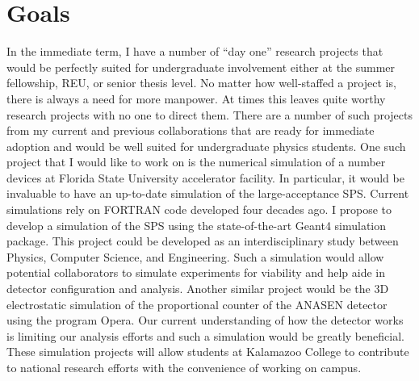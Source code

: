 {%
\section*{Goals}
In the immediate term, I have a number of ``day one'' research projects that would be perfectly suited for undergraduate involvement either at the summer fellowship, REU, or senior thesis level.
No matter how well-staffed a project is, there is always a need for more manpower.
At times %
this leaves quite worthy research projects with no one to direct them. There are a number of such projects from my current and previous collaborations that are ready for immediate adoption and would be well suited for undergraduate physics students.
One such project that I would like to work on %
is the numerical simulation of a number devices at Florida State University accelerator facility. In particular, it would be invaluable to have an up-to-date simulation of the large-acceptance SPS. Current simulations rely on FORTRAN code developed four decades ago. I propose to develop a simulation of the SPS  using the state-of-the-art Geant4 simulation package. This project could be developed as an interdisciplinary study between Physics, Computer Science, and Engineering. Such a simulation would allow potential collaborators to simulate experiments for viability and help aide in detector configuration and analysis. Another similar project would be the 3D electrostatic simulation of the proportional counter of the ANASEN detector using the program Opera. Our current understanding of how the detector works is limiting our analysis efforts and such a simulation would be greatly beneficial. These simulation projects will allow students at Kalamazoo College to contribute to national research efforts with the convenience of working on campus.

}
